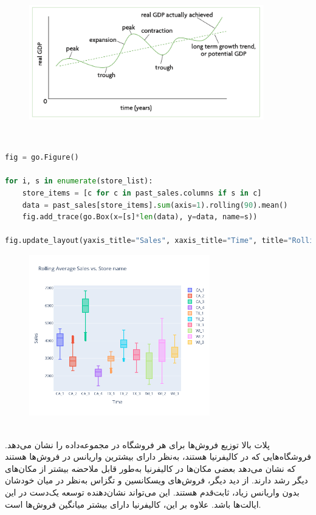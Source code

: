 \documentclass{article}
\begin{document}
\begin{figure}[hbt!]
	\centering
	\includegraphics[width=\textwidth,height=5cm]{Outputs/o1.png}
\end{figure}
\ \\
\begin{latin}
\begin{lstlisting}[language=Python]
fig = go.Figure()

for i, s in enumerate(store_list):
	store_items = [c for c in past_sales.columns if s in c]
	data = past_sales[store_items].sum(axis=1).rolling(90).mean()
	fig.add_trace(go.Box(x=[s]*len(data), y=data, name=s))

fig.update_layout(yaxis_title="Sales", xaxis_title="Time", title="Rolling Average Sales vs. Store name ")
\end{lstlisting}
\end{latin}
\begin{figure}[hbt!]
	\centering
	\includegraphics[width=\textwidth,height=7cm]{Outputs/13.png}
\end{figure}
\ \\
پلات بالا توزیع فروش‌ها برای هر فروشگاه در مجموعه‌داده‌ را نشان می‌دهد. فروشگاه‌هایی که در کالیفرنیا هستند، به‌نظر دارای بیشترین واریانس در فروش‌ها هستند که نشان می‌دهد بعضی مکان‌ها در کالیفرنیا به‌طور قابل ملاحضه‌ بیشتر از مکان‌های دیگر رشد دارند. از دید دیگر، فروش‌های ویسکانسین و تگزاس به‌نظر در میان خودشان بدون واریانس زیاد، ثابت‌قدم هستند. این می‌تواند نشان‌دهنده توسعه یک‌دست در این ایالت‌ها باشد. علاوه بر این، کالیفرنیا دارای بیشتر میانگین فروش‌ها است.
\end{document}
